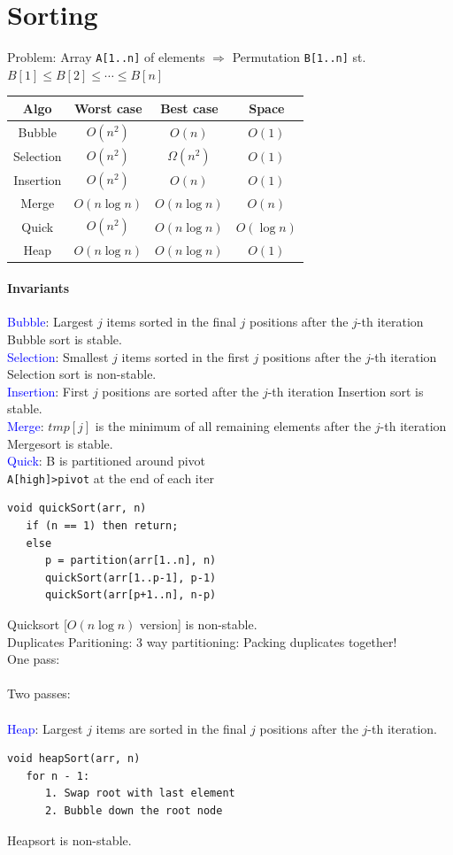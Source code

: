 \section{Sorting}
\textcolor{Bittersweet}{Problem}: Array \verb|A[1..n]| of elements $\Rightarrow$
Permutation \verb|B[1..n]| st. $B[1]\le B[2]\le\cdots\le B[n]$\\
\begin{tabular}{c c  c  c }
  \toprule
  Algo & Worst case & Best case & Space\\
  \midrule
  Bubble & $O(n^2)$ & $O(n)$ & $O(1)$\\
  Selection & $O(n^2)$ & $\Omega(n^2)$ & $O(1)$\\
  Insertion & $O(n^2)$ & $O(n)$ & $O(1)$\\
  Merge & $O(n\log n)$ & $O(n\log n)$ & $O(n)$\\
  Quick & $O(n^2)$ & $O(n\log n)$ & $O(\log n)$\\
  Heap & $O(n\log n)$ & $O(n\log n)$ & $O(1)$\\
  \bottomrule
\end{tabular}
\paragraph{Invariants}
\textcolor{Blue}{Bubble}: Largest $j$ items sorted in the final $j$ positions
after the $j$-th iteration
Bubble sort is stable.\\
\textcolor{Blue}{Selection}: Smallest $j$ items sorted in the first $j$
positions after the $j$-th iteration
Selection sort is non-stable.\\
\textcolor{Blue}{Insertion}: First $j$ positions are sorted after the $j$-th
iteration
Insertion sort is stable.\\
\textcolor{Blue}{Merge}: $tmp[j]$ is the minimum of all remaining elements
after the $j$-th iteration
Mergesort is stable.\\
\textcolor{Blue}{Quick}: B is partitioned around pivot\\
\verb|A[high]>pivot| at the end of each iter
\begin{verbatim}
void quickSort(arr, n)
   if (n == 1) then return;
   else
      p = partition(arr[1..n], n)
      quickSort(arr[1..p-1], p-1)
      quickSort(arr[p+1..n], n-p)
\end{verbatim}
Quicksort [$O(n\log n)$ version] is non-stable.\\
\textcolor{Bittersweet}{Duplicates Paritioning}:
3 way partitioning: Packing duplicates together!\\
One pass: \\\\%
Two passes: \\\\
\textcolor{Blue}{Heap}: Largest $j$ items are sorted in the final $j$ positions
after the $j$-th iteration.
\begin{verbatim}
void heapSort(arr, n)
   for n - 1:
      1. Swap root with last element
      2. Bubble down the root node
\end{verbatim}
Heapsort is non-stable.
